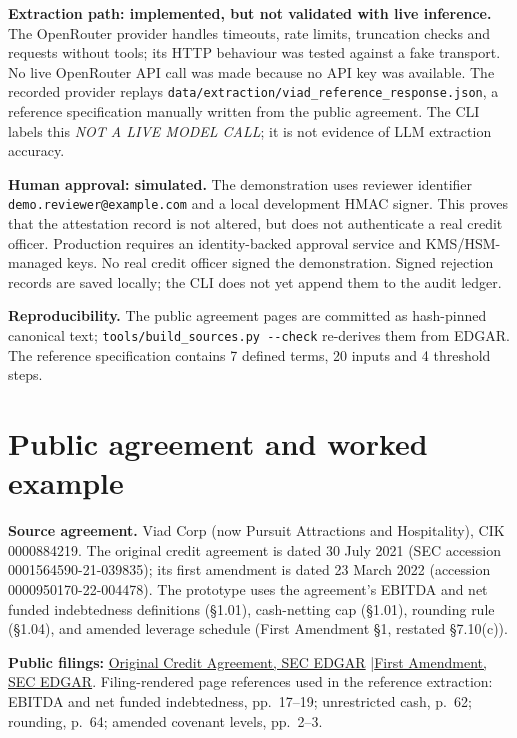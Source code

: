 \documentclass[10pt,letterpaper]{article}
\newcommand{\ct}[1]{\texttt{\small #1}}
\begin{document}
\textbf{Extraction path: implemented, but not validated with live inference.} The OpenRouter provider handles timeouts, rate limits, truncation checks and requests without tools; its HTTP behaviour was tested against a fake transport. No live OpenRouter API call was made because no API key was available. The recorded provider replays \ct{data/\allowbreak extraction/\allowbreak viad\_reference\_response.json}, a reference specification manually written from the public agreement. The CLI labels this \emph{NOT A LIVE MODEL CALL}; it is not evidence of LLM extraction accuracy.

\textbf{Human approval: simulated.} The demonstration uses reviewer identifier \ct{demo.reviewer@example.com} and a local development HMAC signer. This proves that the attestation record is not altered, but does not authenticate a real credit officer. Production requires an identity-backed approval service and KMS/HSM-managed keys. No real credit officer signed the demonstration. Signed rejection records are saved locally; the CLI does not yet append them to the audit ledger.

\textbf{Reproducibility.} The public agreement pages are committed as hash-pinned canonical text; \ct{tools/\allowbreak build\_sources.py {-}{-}check} re-derives them from EDGAR. The reference specification contains 7 defined terms, 20 inputs and 4 threshold steps.

\section{Public agreement and worked example}
\textbf{Source agreement.} Viad Corp (now Pursuit Attractions and Hospitality), CIK 0000884219. The original credit agreement is dated 30 July 2021 (SEC accession 0001564590-21-039835); its first amendment is dated 23 March 2022 (accession 0000950170-22-004478). The prototype uses the agreement's EBITDA and net funded indebtedness definitions (\S1.01), cash-netting cap (\S1.01), rounding rule (\S1.04), and amended leverage schedule (First Amendment \S1, restated \S7.10(c)).

\textbf{Public filings:} \href{https://www.sec.gov/Archives/edgar/data/884219/000156459021039835/vvi-ex101_28.htm}{Original Credit Agreement, SEC EDGAR} \quad|\quad \href{https://www.sec.gov/Archives/edgar/data/884219/000095017022004478/vvi-ex10_1.htm}{First Amendment, SEC EDGAR}. Filing-rendered page references used in the reference extraction: EBITDA and net funded indebtedness, pp.~17--19; unrestricted cash, p.~62; rounding, p.~64; amended covenant levels, pp.~2--3.
\end{document}
